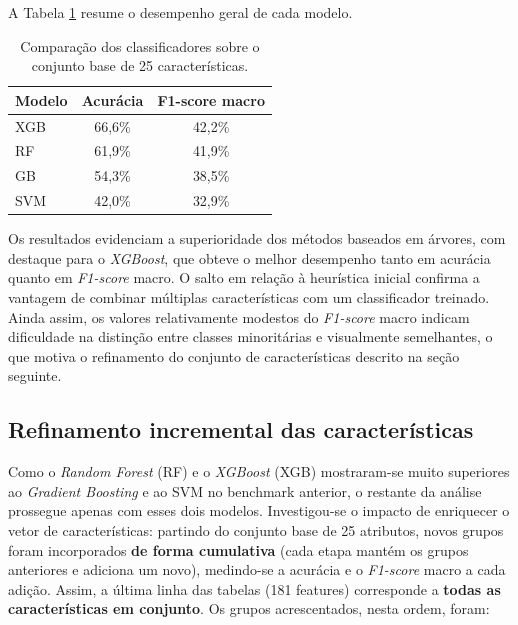 \documentclass[a4paper,11pt]{article}
\begin{document}
A Tabela \ref{tab:benchmark_base} resume o desempenho geral de cada modelo.

\begin{table}[H]
	\centering
	\caption{Comparação dos classificadores sobre o conjunto base de 25 características.}
	\label{tab:benchmark_base}
	\vspace{0.2cm}
	\begin{tabular}{l c c}
		\hline
		\textbf{Modelo} & \textbf{Acurácia} & \textbf{F1-score macro} \\
		\hline
		XGB             & 66,6\%            & 42,2\%                  \\
		RF              & 61,9\%            & 41,9\%                  \\
		GB              & 54,3\%            & 38,5\%                  \\
		SVM             & 42,0\%            & 32,9\%                  \\
		\hline
	\end{tabular}
\end{table}

Os resultados evidenciam a superioridade dos métodos baseados em árvores, com destaque para o \textit{XGBoost}, que obteve o melhor desempenho tanto em acurácia quanto em \textit{F1-score} macro. O salto em relação à heurística inicial confirma a vantagem de combinar múltiplas características com um classificador treinado. Ainda assim, os valores relativamente modestos do \textit{F1-score} macro indicam dificuldade na distinção entre classes minoritárias e visualmente semelhantes, o que motiva o refinamento do conjunto de características descrito na seção seguinte.

\subsection{Refinamento incremental das características}

Como o \textit{Random Forest} (RF) e o \textit{XGBoost} (XGB) mostraram-se muito superiores ao \textit{Gradient Boosting} e ao SVM no benchmark anterior, o restante da análise prossegue apenas com esses dois modelos. Investigou-se o impacto de enriquecer o vetor de características: partindo do conjunto base de 25 atributos, novos grupos foram incorporados \textbf{de forma cumulativa} (cada etapa mantém os grupos anteriores e adiciona um novo), medindo-se a acurácia e o \textit{F1-score} macro a cada adição. Assim, a última linha das tabelas (181 features) corresponde a \textbf{todas as características em conjunto}. Os grupos acrescentados, nesta ordem, foram:
\end{document}
